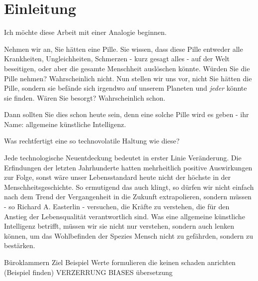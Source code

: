 \chapter{Einleitung}

Ich möchte diese Arbeit mit einer Analogie beginnen.

Nehmen wir an, Sie hätten eine Pille. Sie wissen, dass diese Pille entweder alle Krankheiten, Ungleichheiten, Schmerzen - kurz gesagt alles  - auf der Welt beseitigen, oder aber die gesamte Menschheit auslöschen könnte. Würden Sie die Pille nehmen? Wahrscheinlich nicht. Nun stellen wir uns vor, nicht Sie hätten die Pille, sondern sie befände sich irgendwo auf unserem Planeten und \emph{jeder} könnte sie finden. Wären Sie besorgt? Wahrscheinlich schon.

Dann sollten Sie dies schon heute sein, denn eine solche Pille wird es geben - ihr Name: allgemeine künstliche Intelligenz.

Was rechtfertigt eine so technovolatile Haltung wie diese?


Jede technologische Neuentdeckung bedeutet in erster Linie Veränderung. Die Erfindungen der letzten Jahrhunderte hatten mehrheitlich positive Auswirkungen zur Folge, sonst wäre unser Lebensstandard heute nicht der höchste in der Menschheitsgeschichte. So ermutigend das auch klingt, so dürfen wir nicht einfach nach dem Trend der Vergangenheit in die Zukunft extrapolieren, sondern müssen - so Richard A. Easterlin - versuchen, die Kräfte zu verstehen, die für den Anstieg der Lebensqualität verantwortlich sind.  Was eine allgemeine künstliche Intelligenz betrifft, müssen wir sie nicht nur verstehen, sondern auch lenken können, um das Wohlbefinden der Spezies Mensch nicht zu gefährden, sondern zu bestärken.

Büroklammern Ziel Beispiel
Werte formulieren die keinen schaden anrichten (Beispiel finden)
VERZERRUNG BIASES übersetzung

